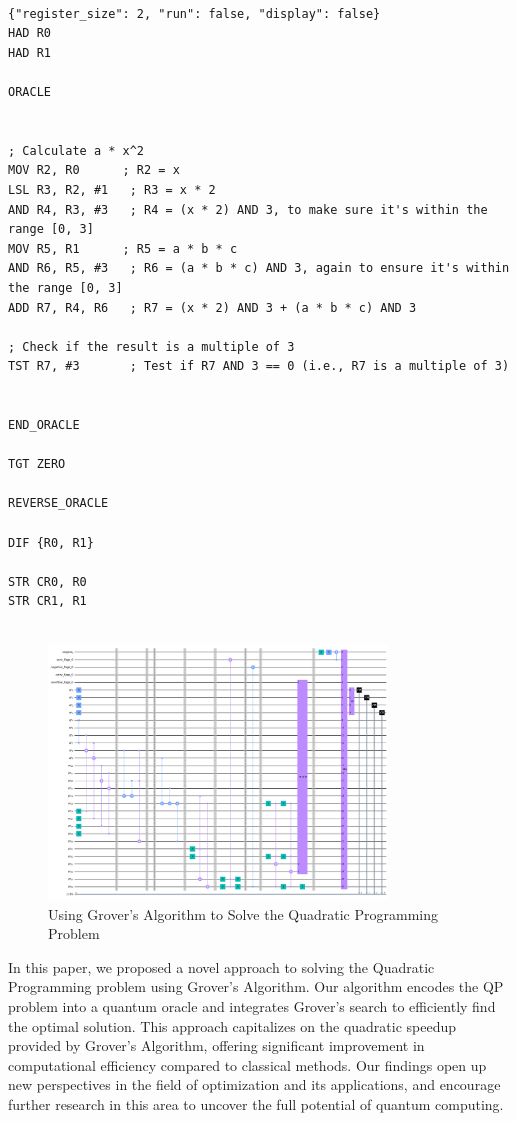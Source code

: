 \begin{lstlisting}

{"register_size": 2, "run": false, "display": false}
HAD R0
HAD R1

ORACLE


; Calculate a * x^2
MOV R2, R0      ; R2 = x
LSL R3, R2, #1   ; R3 = x * 2
AND R4, R3, #3   ; R4 = (x * 2) AND 3, to make sure it's within the range [0, 3]
MOV R5, R1      ; R5 = a * b * c
AND R6, R5, #3   ; R6 = (a * b * c) AND 3, again to ensure it's within the range [0, 3]
ADD R7, R4, R6   ; R7 = (x * 2) AND 3 + (a * b * c) AND 3

; Check if the result is a multiple of 3
TST R7, #3       ; Test if R7 AND 3 == 0 (i.e., R7 is a multiple of 3)


END_ORACLE

TGT ZERO

REVERSE_ORACLE

DIF {R0, R1}

STR CR0, R0
STR CR1, R1


\end{lstlisting}

\begin{figure}[htp]
    \centering
    \includegraphics[width=9cm]{Figures/Quadratic_Programming_circuit.png}
    \caption{Using Grover's Algorithm to Solve the Quadratic Programming Problem}
    \label{fig:Quadratic_Programming}
\end{figure}

In this paper, we proposed a novel approach to solving the Quadratic Programming problem using Grover's Algorithm. Our algorithm encodes the QP problem into a quantum oracle and integrates Grover's search to efficiently find the optimal solution. This approach capitalizes on the quadratic speedup provided by Grover's Algorithm, offering significant improvement in computational efficiency compared to classical methods. Our findings open up new perspectives in the field of optimization and its applications, and encourage further research in this area to uncover the full potential of quantum computing.

